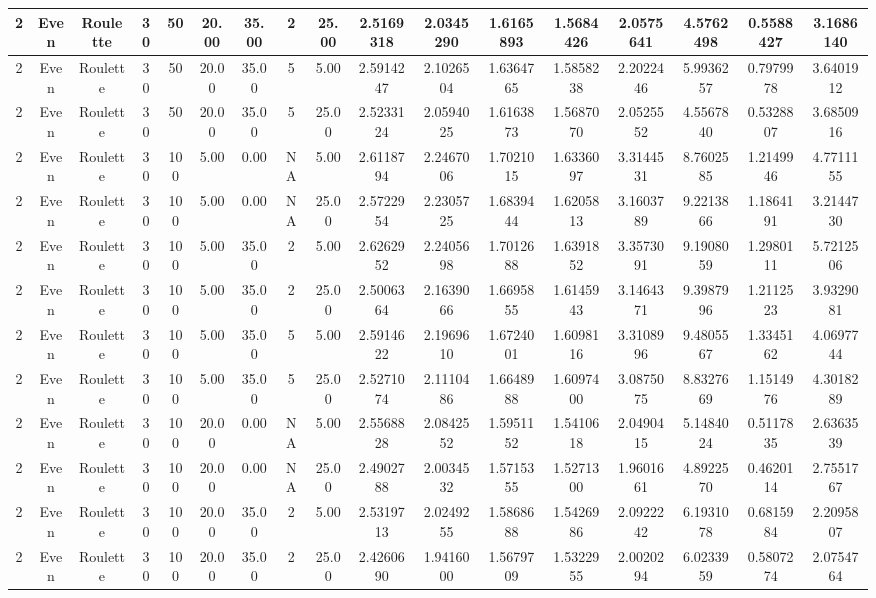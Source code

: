 \begin{longtable}{ | c | c | c | c | c | c | c | c | c | c | c | c | c | c | c | c | c | }
	\hline
	2	&	Even	&	Roulette	&	30	&	50	&	20.00	&	35.00	&	2	&	25.00	&	2.5169318	&	2.0345290	&	1.6165893	&	1.5684426	&	2.0575641	&	4.5762498	&	0.5588427	&	3.1686140 \\
	\hline
	2	&	Even	&	Roulette	&	30	&	50	&	20.00	&	35.00	&	5	&	5.00	&	2.5914247	&	2.1026504	&	1.6364765	&	1.5858238	&	2.2022446	&	5.9936257	&	0.7979978	&	3.6401912 \\
	\hline
	2	&	Even	&	Roulette	&	30	&	50	&	20.00	&	35.00	&	5	&	25.00	&	2.5233124	&	2.0594025	&	1.6163873	&	1.5687070	&	2.0525552	&	4.5567840	&	0.5328807	&	3.6850916 \\
	\hline
	2	&	Even	&	Roulette	&	30	&	100	&	5.00	&	0.00	&	NA	&	5.00	&	2.6118794	&	2.2467006	&	1.7021015	&	1.6336097	&	3.3144531	&	8.7602585	&	1.2149946	&	4.7711155 \\
	\hline
	2	&	Even	&	Roulette	&	30	&	100	&	5.00	&	0.00	&	NA	&	25.00	&	2.5722954	&	2.2305725	&	1.6839444	&	1.6205813	&	3.1603789	&	9.2213866	&	1.1864191	&	3.2144730 \\
	\hline
	2	&	Even	&	Roulette	&	30	&	100	&	5.00	&	35.00	&	2	&	5.00	&	2.6262952	&	2.2405698	&	1.7012688	&	1.6391852	&	3.3573091	&	9.1908059	&	1.2980111	&	5.7212506 \\
	\hline
	2	&	Even	&	Roulette	&	30	&	100	&	5.00	&	35.00	&	2	&	25.00	&	2.5006364	&	2.1639066	&	1.6695855	&	1.6145943	&	3.1464371	&	9.3987996	&	1.2112523	&	3.9329081 \\
	\hline
	2	&	Even	&	Roulette	&	30	&	100	&	5.00	&	35.00	&	5	&	5.00	&	2.5914622	&	2.1969610	&	1.6724001	&	1.6098116	&	3.3108996	&	9.4805567	&	1.3345162	&	4.0697744 \\
	\hline
	2	&	Even	&	Roulette	&	30	&	100	&	5.00	&	35.00	&	5	&	25.00	&	2.5271074	&	2.1110486	&	1.6648988	&	1.6097400	&	3.0875075	&	8.8327669	&	1.1514976	&	4.3018289 \\
	\hline
	2	&	Even	&	Roulette	&	30	&	100	&	20.00	&	0.00	&	NA	&	5.00	&	2.5568828	&	2.0842552	&	1.5951152	&	1.5410618	&	2.0490415	&	5.1484024	&	0.5117835	&	2.6363539 \\
	\hline
	2	&	Even	&	Roulette	&	30	&	100	&	20.00	&	0.00	&	NA	&	25.00	&	2.4902788	&	2.0034532	&	1.5715355	&	1.5271300	&	1.9601661	&	4.8922570	&	0.4620114	&	2.7551767 \\
	\hline
	2	&	Even	&	Roulette	&	30	&	100	&	20.00	&	35.00	&	2	&	5.00	&	2.5319713	&	2.0249255	&	1.5868688	&	1.5426986	&	2.0922242	&	6.1931078	&	0.6815984	&	2.2095807 \\
	\hline
	2	&	Even	&	Roulette	&	30	&	100	&	20.00	&	35.00	&	2	&	25.00	&	2.4260690	&	1.9416000	&	1.5679709	&	1.5322955	&	2.0020294	&	6.0233959	&	0.5807274	&	2.0754764 \\

\end{longtable}
